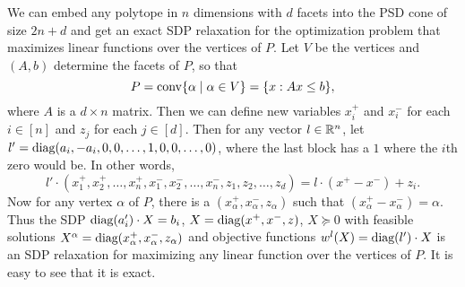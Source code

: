 \begin{example}
We can embed any polytope in $n$ dimensions with $d$ facets into the PSD cone of size $2n+d$ and get an exact SDP relaxation for the optimization problem that maximizes linear functions over the vertices of $P$. Let $V$ be the vertices and $(A,b)$ determine the facets of $P$, so that
\[P = \operatorname{conv}\{\alpha \mid \alpha \in V\} = \{x: Ax \leq b\},\]
where $A$ is a $d \times n$ matrix. Then we can define new variables $x_i^+$ and $x_i^-$ for each $i \in [n]$ and $z_j$ for each $j \in [d]$. Then for any vector $l \in \mathbb R^n$, let $l' = \text{diag}(a_i,-a_i,0,0,\dots,1,0,0,\dots,0)$, where the last block has a $1$ where the $i$th zero would be. In other words, 
\[l' \cdot (x_1^+,x_2^+,\dots,x_n^+,x_1^-,x_2^-,\dots,x_n^-,z_1,z_2,\dots,z_d) = l \cdot (x^+ - x^-) + z_i.\]
Now for any vertex $\alpha$ of $P$, there is a $(x_\alpha^+,x_\alpha^-,z_\alpha)$ such that $(x_\alpha^+ - x_\alpha^-) = \alpha$. Thus the SDP $\text{diag}(a_i') \cdot X = b_i$, $X = \text{diag}(x^+,x^-,z)$, $X \succeq 0$ with feasible solutions $X^\alpha = \text{diag}(x_\alpha^+,x_\alpha^-,z_\alpha)$ and objective functions $w^l(X) = \text{diag}(l') \cdot X$ is an SDP relaxation for maximizing any linear function over the vertices of $P$. It is easy to see that it is exact.

\end{example}

